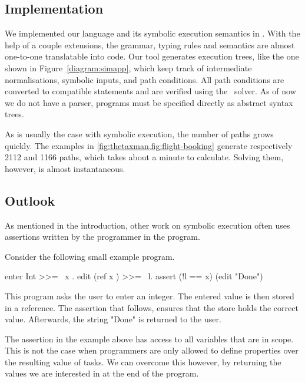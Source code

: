 \subsection{Implementation}

We implemented our language and its symbolic execution semantics in \HASKELL.
With the help of a couple \GHC extensions, the grammar, typing rules and semantics are almost one-to-one translatable into code.
Our tool generates execution trees, like the one shown in Figure~\ref{diagram:simapp},
which keep track of intermediate normalisations, symbolic inputs, and path conditions.
All path conditions are converted to \SMTLIB compatible statements and are verified using the \ZTHREE \SMT~solver.
As of now we do not have a parser, programs must be specified directly as abstract syntax trees.

As is usually the case with symbolic execution, the number of paths grows quickly.
The examples in \cref{fig:thetaxman,fig:flight-booking} generate respectively 2112 and 1166 paths,
which takes about a minute to calculate.
Solving them, however, is almost instantaneous.



\subsection{Outlook}
\label{subsec:outlook}

As mentioned in the introduction, other work on symbolic execution often uses assertions written by the programmer in the program.

\begin{example}
  Consider the following small example program.
  \begin{TASK}
    enter Int >>= \ x . edit (ref x ) >>= \ l. assert (!l == x) (edit "Done")
  \end{TASK}

  This program asks the user to enter an integer.
  The entered value is then stored in a reference.
  The assertion that follows, ensures that the store holds the correct value.
  Afterwards, the string "Done" is returned to the user.
\end{example}

The assertion in the example above has access to all variables that are in scope.
This is not the case when programmers are only allowed to define properties over the resulting value of tasks.
We can overcome this however, by returning the values we are interested in at the end of the program.

